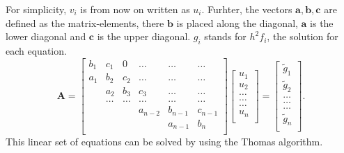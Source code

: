 \documentclass[%
oneside,                 %
final,                   %
10pt]{article}
\begin{document}
For simplicity, $v_i$ is from now on written as $u_i$.
Furhter, the vectors $ \mathbf{a}, \mathbf{b}, \mathbf{c}$ are defined as the matrix-elements, there $ \mathbf{b}$ is placed along the diagonal, $\mathbf{a}$ is the lower diagonal and $\mathbf{c}$ is the upper diagonal. $g_i$ stands for $h^2f_i$, the solution for each equation. \\
\[
    \mathbf{A} = \begin{bmatrix}
                           b_1& c_1 & 0 &\dots   & \dots &\dots \\
                           a_1 & b_2 & c_2 &\dots &\dots &\dots \\
                           & a_2 & b_3 & c_3 & \dots & \dots \\
                           & \dots   & \dots &\dots   &\dots & \dots \\
                           &   &  &a_{n-2}  &b_{n-1}& c_{n-1} \\
                           &    &  &   &a_{n-1} & b_n \\
                      \end{bmatrix}\begin{bmatrix}
                           u_1\\
                           u_2\\
                           \dots \\
                          \dots  \\
                          \dots \\
                           u_n\\
                      \end{bmatrix}
  =\begin{bmatrix}
                           \tilde{g}_1\\
                           \tilde{g}_2\\
                           \dots \\
                           \dots \\
                          \dots \\
                           \tilde{g}_n\\
                      \end{bmatrix}.
\]
This linear set of equations can be solved by using the Thomas algorithm.
\end{document}
